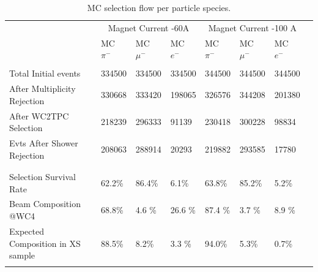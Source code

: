 \begin{table}[]
\centering
\begin{tabular}{| l | l | l | l | l | l | l | l | }
\hline
 &  \multicolumn{3}{|c|}{Magnet Current -60A} & \multicolumn{3}{|c|}{Magnet Current -100 A}\\

                                                  & MC $\pi^-$   & MC  $ \mu^-$ & MC  $e^-$ & MC  $\pi^-$ & MC  $\mu^-$ & MC  $e^-$  \\
\hline
&  &  &  & & &\\  
Total Initial events                     & 334500  & 334500 & 334500 &344500 &344500& 344500 \\
After Multiplicity Rejection        & 330668  & 333420 & 198065 &326576 &344208& 201380 \\
After WC2TPC Selection          & 218239  & 296333 & 91139  &230418 &300228& 98834  \\
Evts After Shower Rejection     & 208063  & 288914 &  20293 &219882 &293585& 17780  \\
&  &  &  & & &\\  
  \hline
&  &  &  & & &\\  
Selection Survival Rate           &62.2\% & 86.4\% & 6.1\% & 63.8\%& 85.2\%& 5.2\%\\
Beam Composition  @WC4      &  68.8\%   &  4.6 \%  & 26.6 \%    & 87.4 \% & 3.7 \%  & 8.9 \% \\ %
Expected Composition in XS sample &  88.5\%   & 8.2\%   & 3.3 \%   & 94.0\%	& 5.3\% & 0.7\%\\
                                                  &                      &                       &                   &                       &                        &\\  
\hline
\end{tabular}
\caption{MC selection flow per particle species.}
\label{tab:MCafterCutContaminants}
\end{table}


